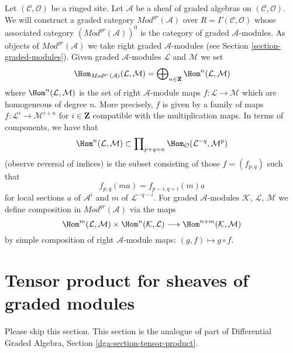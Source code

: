 \medskip\noindent
Let $(\mathcal{C}, \mathcal{O})$ be a ringed site.
Let $\mathcal{A}$ be a sheaf of graded algebras
on $(\mathcal{C}, \mathcal{O})$. We will construct
a graded category $\textit{Mod}^{gr}(\mathcal{A})$ over
$R = \Gamma(\mathcal{C}, \mathcal{O})$
whose associated category $(\textit{Mod}^{gr}(\mathcal{A}))^0$
is the category of graded $\mathcal{A}$-modules. As objects
of $\textit{Mod}^{gr}(\mathcal{A})$ we take right graded
$\mathcal{A}$-modules (see
Section \ref{section-graded-modules}). Given graded
$\mathcal{A}$-modules $\mathcal{L}$ and $\mathcal{M}$ we set
$$
\Hom_{\textit{Mod}^{gr}(\mathcal{A})}(\mathcal{L}, \mathcal{M}) =
\bigoplus\nolimits_{n \in \mathbf{Z}} \Hom^n(\mathcal{L}, \mathcal{M})
$$
where
$\Hom^n(\mathcal{L}, \mathcal{M})$
is the set of right $\mathcal{A}$-module maps
$f : \mathcal{L} \to \mathcal{M}$ which
are homogeneous of degree $n$. More precisely, $f$ is given
by a family of maps $f : \mathcal{L}^i \to \mathcal{M}^{i + n}$
for $i \in \mathbf{Z}$ compatible with the multiplication
maps. In terms of components, we have that
$$
\Hom^n(\mathcal{L}, \mathcal{M})
\subset
\prod\nolimits_{p + q = n}
\Hom_\mathcal{O}(\mathcal{L}^{-q}, \mathcal{M}^p)
$$
(observe reversal of indices) is the subset consisting of those
$f = (f_{p, q})$ such that
$$
f_{p, q}(m a) = f_{p - i, q + i}(m)a
$$
for local sections $a$ of $\mathcal{A}^i$ and
$m$ of $\mathcal{L}^{-q - i}$. For graded $\mathcal{A}$-modules
$\mathcal{K}$, $\mathcal{L}$, $\mathcal{M}$
we define composition in $\textit{Mod}^{gr}(\mathcal{A})$ via
the maps
$$
\Hom^m(\mathcal{L}, \mathcal{M}) \times
\Hom^n(\mathcal{K}, \mathcal{L}) \longrightarrow
\Hom^{n + m}(\mathcal{K}, \mathcal{M})
$$
by simple composition of right
$\mathcal{A}$-module maps: $(g, f) \mapsto g \circ f$.





\section{Tensor product for sheaves of graded modules}
\label{section-tensor-product}

\noindent
Please skip this section. This section is the analogue of part of
Differential Graded Algebra, Section \ref{dga-section-tensor-product}.

